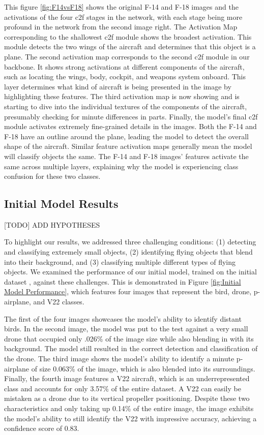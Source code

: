 \documentclass[10pt,twocolumn,letterpaper]{article}
\begin{document}
This figure \ref{fig:F14vsF18} shows the original F-14 and F-18 images and the activations of the four c2f stages in the network, with each stage being more profound in the network from the second image right. The Activation Map corresponding to the shallowest c2f module shows the broadest activation. This module detects the two wings of the aircraft and determines that this object is a plane. The second activation map corresponds to the second c2f module in our backbone. It shows strong activations at different components of the aircraft, such as locating the wings, body, cockpit, and weapons system onboard. This layer determines what kind of aircraft is being presented in the image by highlighting these features. The third activation map is now showing and is starting to dive into the individual textures of the components of the aircraft, presumably checking for minute differences in parts. Finally, the model's final c2f module activates extremely fine-grained details in the images. Both the F-14 and F-18 have an outline around the plane, leading the model to detect the overall shape of the aircraft. Similar feature activation maps generally mean the model will classify objects the same. The F-14 and F-18 images' features activate the same across multiple layers, explaining why the model is experiencing class confusion for these two classes.

\subsection{Initial Model Results}

[TODO] ADD HYPOTHESES

To highlight our results, we addressed three challenging conditions: (1) detecting and classifying extremely small objects, (2) identifying flying objects that blend into their background, and (3) classifying multiple different types of flying objects. We examined the performance of our initial model, trained on the initial dataset \cite{InitialDataset}, against these challenges. This is demonstrated in Figure \ref{fig:Initial Model Performance}, which features four images that represent the bird, drone, p-airplane, and V22 classes.

The first of the four images showcases the model's ability to identify distant birds. In the second image, the model was put to the test against a very small drone that occupied only .026\% of the image size while also blending in with its background. The model still resulted in the correct detection and classification of the drone. The third image shows the model's ability to identify a minute p-airplane of size 0.063\% of the image, which is also blended into its surroundings. Finally, the fourth image features a V22 aircraft, which is an underrepresented class and accounts for only 3.57\% of the entire dataset. A V22 can easily be mistaken as a drone due to its vertical propeller positioning. Despite these two characteristics and only taking up 0.14\% of the entire image, the image exhibits the model's ability to still identify the V22 with impressive accuracy, achieving a confidence score of 0.83.
\end{document}
